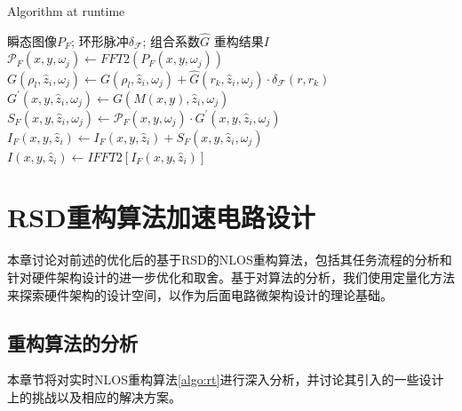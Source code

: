 \documentclass[master]{shtthesis}             %
\begin{document}
\begin{algorithm*}[!t]
    \caption{Algorithm at runtime}
    \label{algo:rt}
    \begin{algorithmic}[1]
        \Require 瞬态图像$P_F$; 环形脉冲$\delta_{\mathcal{F}}$; 组合系数$\hat{G}$
        \Ensure 重构结果$I$
                \State $\mathcal{P}_F(x, y, \omega_j) \gets FFT2(P_F(x, y, \omega_j))$
                        \State $G(\rho_l, \hat{z}_i, \omega_j) \gets G(\rho_l, \hat{z}_i, \omega_j) + \hat{G}(r_k, \hat{z}_i, \omega_j)\cdot \delta_{\mathcal{F}}(r, r_k) $
                    \EndFor
                \EndFor
                 
                        \State $G^{\prime}(x, y, \hat{z}_i, \omega_j) \gets G(M(x, y), \hat{z}_i, \omega_j)$ 
                        \State $ S_F(x, y, \hat{z}_i, \omega_j) \gets \mathcal{P}_F(x, y, \omega_j) \cdot G^{\prime}(x, y, \hat{z}_i, \omega_j) $ 
                    \EndFor
                \EndFor
                \State $I_F(x, y, \hat{z}_i) \gets I_F(x, y, \hat{z}_i) + S_F(x, y, \hat{z}_i, \omega_j)$ 
            \EndFor
            \State $I(x, y, \hat{z}_i) \gets IFFT2 \left[ I_F(x, y, \hat{z}_i) \right]$ \EndFor 
        \EndProcedure
    \end{algorithmic}
\end{algorithm*}

\chapter{RSD重构算法加速电路设计}
本章讨论对前述的优化后的基于RSD的NLOS重构算法，包括其任务流程的分析和针对硬件架构设计的进一步优化和取舍。基于对算法的分析，我们使用定量化方法来探索硬件架构的设计空间，以作为后面电路微架构设计的理论基础。

\section{重构算法的分析} 
本章节将对实时NLOS重构算法\ref{algo:rt}进行深入分析，并讨论其引入的一些设计上的挑战以及相应的解决方案。
\end{document}
